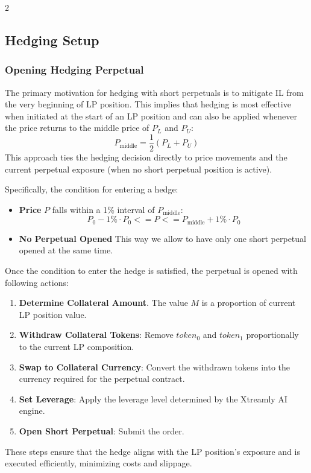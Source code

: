 \documentclass[10pt]{article}
\begin{document}
\begin{multicols}{2}
\subsection{Hedging Setup}

\subsubsection{Opening Hedging Perpetual}
The primary motivation for hedging with short perpetuals is to mitigate IL from the very beginning of LP position. This implies that hedging is most effective when initiated at the start of an LP position and can also be applied whenever the price returns to the middle price of $P_L$ and $P_U$:  
$$P_\text{middle} = \frac{1}{2}(P_L+P_U)$$
This approach ties the hedging decision directly to price movements and the current perpetual exposure (when no short perpetual position is active).

\medskip
Specifically, the condition for entering a hedge:
\begin{itemize}
	\item \textbf{Price} $P$ falls within a 1\% interval of $P_\text{middle}$:
	$$P_0 - 1\% \cdot P_0 <= P <= P_\text{middle} + 1\% \cdot P_0$$
	\item \textbf{No Perpetual Opened} This way we allow to have only one short perpetual opened at the same time.
\end{itemize}

\medskip
Once the condition to enter the hedge is satisfied, the perpetual is opened with following actions:
\begin{enumerate}
	\item \textbf{Determine Collateral Amount}. The value $M$ is a proportion of current LP position value.
	\item \textbf{Withdraw Collateral Tokens}: Remove $token_0$ and $token_1$ proportionally to the current LP composition.
	\item \textbf{Swap to Collateral Currency}: Convert the withdrawn tokens into the currency required for the perpetual contract.
	\item \textbf{Set Leverage}: Apply the leverage level determined by the Xtreamly AI engine.
	\item \textbf{Open Short Perpetual}: Submit the order.
\end{enumerate}
These steps ensure that the hedge aligns with the LP position’s exposure and is executed efficiently, minimizing costs and slippage.


\end{multicols}
\end{document}
